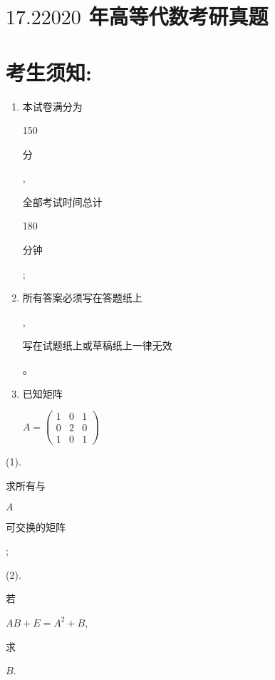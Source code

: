 \documentclass[10pt]{article}
\begin{document}
\section{$17.22020$ 年高等代数考研真题}
\section{考生须知:}
\begin{enumerate}
  \item \begin{CJK}{UTF8}{mj}本试卷满分为\end{CJK} 150 \begin{CJK}{UTF8}{mj}分\end{CJK}, \begin{CJK}{UTF8}{mj}全部考试时间总计\end{CJK} 180 \begin{CJK}{UTF8}{mj}分钟\end{CJK};

  \item \begin{CJK}{UTF8}{mj}所有答案必须写在答题纸上\end{CJK}, \begin{CJK}{UTF8}{mj}写在试题纸上或草稿纸上一律无效\end{CJK}。

  \item \begin{CJK}{UTF8}{mj}已知矩阵\end{CJK} $A=\left(\begin{array}{lll}1 & 0 & 1 \\ 0 & 2 & 0 \\ 1 & 0 & 1\end{array}\right)$

\end{enumerate}
(1). \begin{CJK}{UTF8}{mj}求所有与\end{CJK} $A$ \begin{CJK}{UTF8}{mj}可交换的矩阵\end{CJK};

(2). \begin{CJK}{UTF8}{mj}若\end{CJK} $A B+E=A^{2}+B$, \begin{CJK}{UTF8}{mj}求\end{CJK} $B$.
\end{document}
